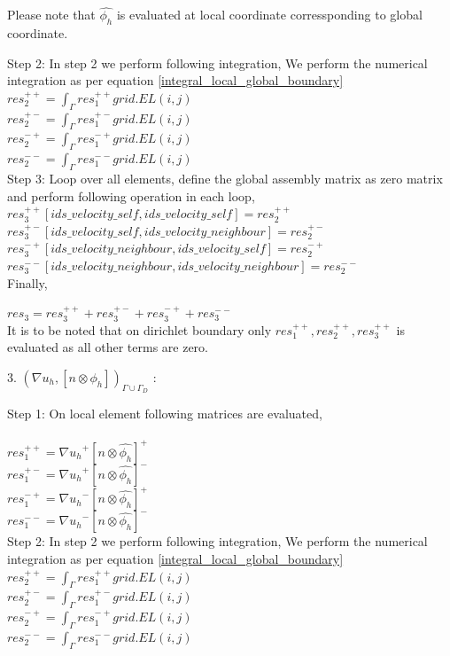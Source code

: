 \documentclass[a4paper,12pt]{book}
\begin{document}
Please note that $\hat{\phi_h}$ is evaluated at local coordinate corressponding to global coordinate.

Step 2: In step 2 we perform following integration, 
We perform the numerical integration as per equation \ref{integral_local_global_boundary}
\\ 
$res_2^{++} = \int_{\Gamma} res_1^{++} grid.EL(i,j)$\\
$res_2^{+-} = \int_{\Gamma} res_1^{+-} grid.EL(i,j)$\\
$res_2^{-+} = \int_{\Gamma} res_1^{-+} grid.EL(i,j)$\\
$res_2^{--} = \int_{\Gamma} res_1^{--} grid.EL(i,j)$\\

Step 3: Loop over all elements, define the global assembly matrix as zero matrix and perform following operation in each loop,
\\
$res_3^{++}[ids\_velocity\_self,ids\_velocity\_self] = res_2^{++}$\\
$res_3^{+-}[ids\_velocity\_self,ids\_velocity\_neighbour] = res_2^{+-}$\\
$res_3^{-+}[ids\_velocity\_neighbour,ids\_velocity\_self] = res_2^{-+}$\\
$res_3^{--}[ids\_velocity\_neighbour,ids\_velocity\_neighbour] = res_2^{--}$\\

Finally,

$res_3 = res_3^{++} + res_3^{+-} + res_3^{-+} + res_3^{--}$\\

It is to be noted that on dirichlet boundary only $res_1^{++}, res_2^{++}, res_3^{++}$ is evaluated as all other terms are zero.

3. $({\nabla u_h}, [n \otimes \phi_h])_{\Gamma \cup \Gamma_D}$ :

Step 1: On local element following matrices are evaluated,\\
\\
$res_1^{++} = {\nabla u_h}^+ [n \otimes \hat{\phi_h}]^+$\\
$res_1^{+-} = {\nabla u_h}^+ [n \otimes \hat{\phi_h}]^-$\\
$res_1^{-+} = {\nabla u_h}^- [n \otimes \hat{\phi_h}]^+$\\
$res_1^{--} = {\nabla u_h}^- [n \otimes \hat{\phi_h}]^-$\\

Step 2: In step 2 we perform following integration, 
We perform the numerical integration as per equation \ref{integral_local_global_boundary}
\\ 
$res_2^{++} = \int_{\Gamma} res_1^{++} grid.EL(i,j)$\\
$res_2^{+-} = \int_{\Gamma} res_1^{+-} grid.EL(i,j)$\\
$res_2^{-+} = \int_{\Gamma} res_1^{-+} grid.EL(i,j)$\\
$res_2^{--} = \int_{\Gamma} res_1^{--} grid.EL(i,j)$\\
\end{document}

